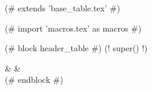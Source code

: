 (# extends 'base_table.tex' #)

(# import 'macros.tex' as macros #)


(# block header_table #)
(! super() !)

  &    &  \\

(# endblock #)